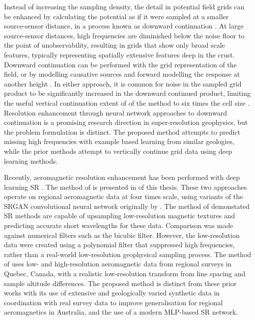 Instead of increasing the sampling density, the detail in potential field grids can be enhanced by calculating the potential as if it were sampled at a smaller source-sensor distance, in a process known as downward continuation \parencite{bullardDeterminationMassesNecessary1948}.
At large source-sensor distances, high frequencies are diminished below the noise floor to the point of unobservability, resulting in grids that show only broad scale features, typically representing spatially extensive features deep in the crust.
Downward continuation can be performed with the grid representation of the field, or by modelling causative sources and forward modelling the response at another height \parencite{pilkingtonPotentialFieldContinuation2017}.
In either approach, it is common for noise in the sampled grid product to be significantly increased in the downward continued product, limiting the useful vertical continuation extent of of the method to six times the cell size \parencite{dampneyEquivalentSourceTechnique1969,zuoDownwardContinuationTransformation2020}.
Resolution enhancement through neural network approaches to downward continuation \parencite{liStableDownwardContinuation2023,yeHighprecisionDownwardContinuation2022} is a promising research direction in super-resolution geophysics, but the problem formulation is distinct.
The proposed method attempts to predict missing high frequencies with example based learning from similar geologies, while the prior methods attempt to vertically continue grid data using deep learning methods.

Recently, aeromagnetic resolution enhancement has been performed with deep learning SR \parencite{bavandsavadkoohiHighresolutionAeromagneticMap2023,smithMagneticGridResolution2022}.
The method of \textcite{smithMagneticGridResolution2022} is presented in  of this thesis.
These two approaches operate on regional aeromagnetic data at four times scale, using variants of the SRGAN convolutional neural network originally by \textcite{ledigPhotorealisticSingleImage2017}.
The method of \textcite{smithMagneticGridResolution2022} demonstated SR methods are capable of upsampling low-resolution magnetic textures and predicting accurate short wavelengths for these data.
Comparison was made against numerical filters such as the bicubic filter.
However, the low-resolution data were created using a polynomial filter that suppressed high frequencies, rather than a real-world low-resolution geophysical sampling process.
The method of \textcite{bavandsavadkoohiHighresolutionAeromagneticMap2023} uses low- and high-resolution aeromagnetic data from regional surveys in Quebec, Canada, with a realistic low-resolution transform from line spacing and sample altitude differences.
The proposed method is distinct from these prior works with its use of extensive and geologically varied synthetic data in coordination with real survey data to improve generalisation for regional aeromagnetics in Australia, and the use of a modern MLP-based SR network.

